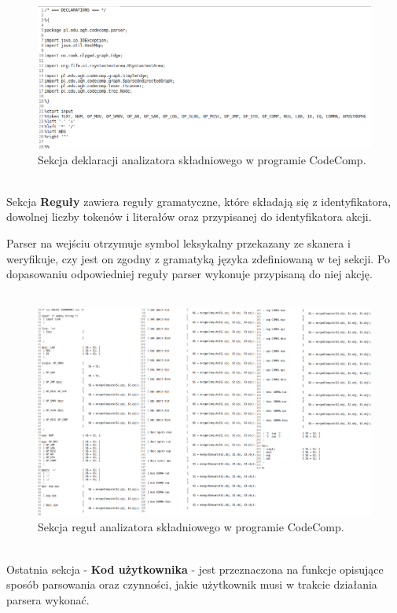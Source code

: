 \documentclass[a4paper,12pt]{article}
\begin{document}
\begin{figure}[here]
\centering
\includegraphics[scale=0.4]{gfx/parser_dec.png}
\caption{Sekcja deklaracji analizatora składniowego w programie CodeComp.}
\end{figure}
\\

Sekcja \textbf{Reguły} zawiera reguły gramatyczne, które składają się z identyfikatora, dowolnej liczby tokenów i literałów oraz przypisanej do identyfikatora akcji.

Parser na wejściu otrzymuje symbol leksykalny przekazany ze skanera i weryfikuje, czy jest on zgodny z gramatyką języka zdefiniowaną w tej sekcji. Po dopasowaniu odpowiedniej reguły parser wykonuje przypisaną do niej akcję.
\\ \\
\begin{figure}[here]
\centering
\includegraphics[scale=0.25]{gfx/parser_rules.png}
\caption{Sekcja reguł analizatora składniowego w programie CodeComp.}
\end{figure}
\\

Ostatnia sekcja - \textbf{Kod użytkownika} - jest przeznaczona na funkcje opisujące sposób parsowania oraz czynności, jakie użytkownik musi w trakcie działania parsera wykonać.
\end{document}
